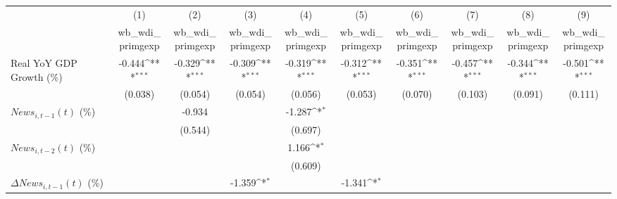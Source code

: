 {
\def\sym#1{\ifmmode^{#1}\else\(^{#1}\)\fi}
\begin{tabular}{l*{9}{c}}
\toprule
                    &\multicolumn{1}{c}{(1)}&\multicolumn{1}{c}{(2)}&\multicolumn{1}{c}{(3)}&\multicolumn{1}{c}{(4)}&\multicolumn{1}{c}{(5)}&\multicolumn{1}{c}{(6)}&\multicolumn{1}{c}{(7)}&\multicolumn{1}{c}{(8)}&\multicolumn{1}{c}{(9)}\\
                    &\multicolumn{1}{c}{wb_wdi_primgexp}&\multicolumn{1}{c}{wb_wdi_primgexp}&\multicolumn{1}{c}{wb_wdi_primgexp}&\multicolumn{1}{c}{wb_wdi_primgexp}&\multicolumn{1}{c}{wb_wdi_primgexp}&\multicolumn{1}{c}{wb_wdi_primgexp}&\multicolumn{1}{c}{wb_wdi_primgexp}&\multicolumn{1}{c}{wb_wdi_primgexp}&\multicolumn{1}{c}{wb_wdi_primgexp}\\
\midrule
Real YoY GDP Growth (\%)&      -0.444\sym{***}&      -0.329\sym{***}&      -0.309\sym{***}&      -0.319\sym{***}&      -0.312\sym{***}&      -0.351\sym{***}&      -0.457\sym{***}&      -0.344\sym{***}&      -0.501\sym{***}\\
                    &     (0.038)         &     (0.054)         &     (0.054)         &     (0.056)         &     (0.053)         &     (0.070)         &     (0.103)         &     (0.091)         &     (0.111)         \\
\addlinespace
$ News_{i,t-1}(t)$ (\%)&                     &      -0.934         &                     &      -1.287\sym{*}  &                     &                     &                     &                     &                     \\
                    &                     &     (0.544)         &                     &     (0.697)         &                     &                     &                     &                     &                     \\
\addlinespace
$ News_{i,t-2}(t)$ (\%)&                     &                     &                     &       1.166\sym{*}  &                     &                     &                     &                     &                     \\
                    &                     &                     &                     &     (0.609)         &                     &                     &                     &                     &                     \\
\addlinespace
$ \Delta News_{i,t-1}(t)$ (\%)&                     &                     &      -1.359\sym{*}  &                     &      -1.341\sym{*}  &                     &                     &                     &                     \\

\end{tabular}}
